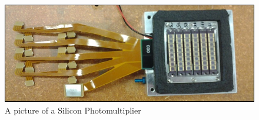 \begin{figure}
\centering
\includegraphics[width=\linewidth]{Figures/SiPM.jpg}
\caption{A picture of a Silicon Photomultiplier}
\label{fig:SiPM}
\end{figure}




